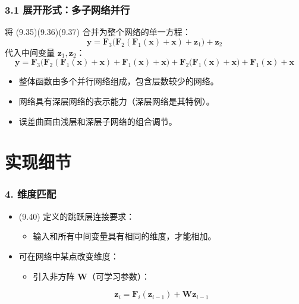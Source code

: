 \documentclass[t,aspectratio=169]{beamer} %
\begin{document}
\begin{frame}
    \frametitle{3.1 展开形式：多子网络并行}
    将 (9.35)(9.36)(9.37) 合并为整个网络的单一方程：
    \begin{equation}
        \mathbf{y} = \mathbf{F}_3\bigl( \mathbf{F}_2( \mathbf{F}_1(\mathbf{x}) + \mathbf{x} ) + \mathbf{z}_1 \bigr) + \mathbf{z}_2
        \tag{9.39}
    \end{equation}
    代入中间变量 $\mathbf{z}_1, \mathbf{z}_2$：
    \begin{equation}
        \mathbf{y} = \mathbf{F}_3\bigl( \mathbf{F}_2( \mathbf{F}_1(\mathbf{x}) + \mathbf{x} ) + \mathbf{F}_1(\mathbf{x}) + \mathbf{x} \bigr) + \mathbf{F}_2\bigl( \mathbf{F}_1(\mathbf{x}) + \mathbf{x} \bigr) + \mathbf{F}_1(\mathbf{x}) + \mathbf{x}
        \tag{9.40}
    \end{equation}
    \begin{itemize}
        \item 整体函数由\alert{多个并行网络}组成，包含层数较少的网络。
        \item 网络具有深层网络的\alert{表示能力}（深层网络是其特例）。
        \item 误差曲面由\alert{浅层和深层子网络的组合}调节。
    \end{itemize}
\end{frame}

\section{实现细节}

\begin{frame}
    \frametitle{4. 维度匹配}
    \begin{itemize}
        \item (9.40) 定义的跳跃层连接要求：
        \begin{itemize}
            \item 输入和所有中间变量具有\alert{相同的维度}，才能相加。
        \end{itemize}
        \item 可在网络中某点\alert{改变维度}：
        \begin{itemize}
            \item 引入\alert{非方阵} $\mathbf{W}$（可学习参数）：
        \end{itemize}
        \begin{equation}
            \mathbf{z}_i = \mathbf{F}_i(\mathbf{z}_{i-1}) + \mathbf{W}\mathbf{z}_{i-1}
            \tag{9.41}
        \end{equation}
    \end{itemize}
\end{frame}
\end{document}
